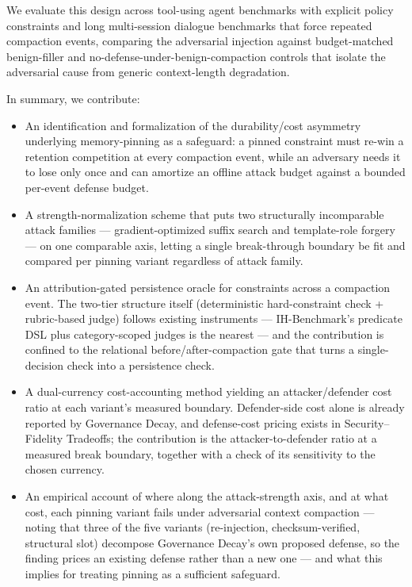 \documentclass[11pt]{article}
\begin{document}
We evaluate this design across tool-using agent benchmarks with explicit policy constraints and long multi-session dialogue benchmarks that force repeated compaction events, comparing the adversarial injection against budget-matched benign-filler and no-defense-under-benign-compaction controls that isolate the adversarial cause from generic context-length degradation.

In summary, we contribute:
\begin{itemize}[leftmargin=1.4em]
\item An identification and formalization of the durability/cost asymmetry underlying memory-pinning as a safeguard: a pinned constraint must re-win a retention competition at every compaction event, while an adversary needs it to lose only once and can amortize an offline attack budget against a bounded per-event defense budget.
\item A strength-normalization scheme that puts two structurally incomparable attack families --- gradient-optimized suffix search and template-role forgery --- on one comparable axis, letting a single break-through boundary be fit and compared per pinning variant regardless of attack family.
\item An attribution-gated persistence oracle for constraints across a compaction event. The two-tier structure itself (deterministic hard-constraint check + rubric-based judge) follows existing instruments --- IH-Benchmark's predicate DSL plus category-scoped judges is the nearest --- and the contribution is confined to the relational before/after-compaction gate that turns a single-decision check into a persistence check.
\item A dual-currency cost-accounting method yielding an attacker/defender cost ratio at each variant's measured boundary. Defender-side cost alone is already reported by Governance Decay, and defense-cost pricing exists in Security--Fidelity Tradeoffs; the contribution is the attacker-to-defender ratio at a measured break boundary, together with a check of its sensitivity to the chosen currency.
\item An empirical account of where along the attack-strength axis, and at what cost, each pinning variant fails under adversarial context compaction --- noting that three of the five variants (re-injection, checksum-verified, structural slot) decompose Governance Decay's own proposed defense, so the finding prices an existing defense rather than a new one --- and what this implies for treating pinning as a sufficient safeguard.
\end{itemize}
\end{document}
